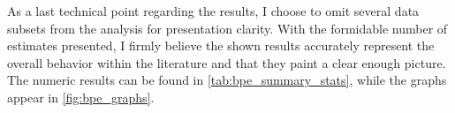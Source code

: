 As a last technical point regarding the results, I choose to omit several data subsets from the analysis for presentation clarity. With the formidable number of estimates presented, I firmly believe the shown results accurately represent the overall behavior within the literature and that they paint a clear enough picture. The numeric results can be found in \autoref{tab:bpe_summary_stats}, while the graphs appear in \autoref{fig:bpe_graphs}.


  

    
